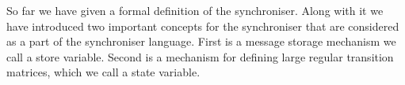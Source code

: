 \begin{enumerate}
%
%
%
  \end{enumerate}

So far we have given a formal definition of the synchroniser. Along with it we have introduced two important concepts for the synchroniser that are considered as a part of the synchroniser language. First is a message storage mechanism we call a store variable. Second is a mechanism for defining large regular transition matrices, which we call a state variable.


